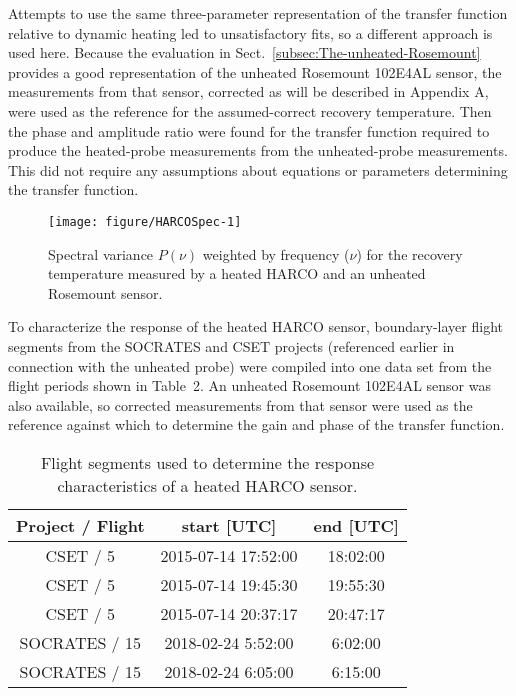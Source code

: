 \documentclass[11pt,twoside,american,12pt,twoside,american]{article}\usepackage[]{graphicx}\usepackage[]{color}
\makeatletter
\def\maxwidth{ %
  \ifdim\Gin@nat@width>\linewidth
    \linewidth
  \else
    \Gin@nat@width
  \fi
}
\newenvironment{knitrout}{}{} %
\providecommand{\tabularnewline}{\\}
\makeatother
\begin{document}
Attempts to use the same three-parameter representation of the transfer
function relative to dynamic heating led to unsatisfactory fits, so
a different approach is used here. Because the evaluation in Sect.~\ref{subsec:The-unheated-Rosemount}
provides a good representation of the unheated Rosemount 102E4AL sensor,
the measurements from that sensor, corrected as will be described
in Appendix A, were used as the reference for the assumed-correct
recovery temperature. Then the phase and amplitude ratio were found
for the transfer function required to produce the heated-probe measurements
from the unheated-probe measurements. This did not require any assumptions
about equations or parameters determining the transfer function.







\begin{knitrout}
\color{fgcolor}\begin{figure}[t]

{\centering \texttt{[image: figure/HARCOSpec-1]} 

}

\caption[Spectral variance $P(\nu)$ weighted by frequency ($\nu$) for the recovery temperature measured by a heated  HARCO and an unheated Rosemount sensor]{Spectral variance $P(\nu)$ weighted by frequency ($\nu$) for the recovery temperature measured by a heated  HARCO and an unheated Rosemount sensor.}\label{fig:HARCOSpec}
\end{figure}


\end{knitrout}



To characterize the response of the heated HARCO sensor, boundary-layer
flight segments from the SOCRATES and CSET projects (referenced earlier
in connection with the unheated probe) were compiled into one data
set from the flight periods shown in Table~2. An unheated Rosemount
102E4AL sensor was also available, so corrected measurements from
that sensor were used as the reference against which to determine
the gain and phase of the transfer function.
\begin{table}[h]
\begin{centering}
\begin{tabular}{|c|c|c|}
\hline 
\textbf{Project / Flight} &
\textbf{start {[}UTC{]}} &
\textbf{end {[}UTC{]}}\tabularnewline
\hline 
\hline 
CSET / 5 &
2015-07-14 17:52:00 &
18:02:00\tabularnewline
\hline 
CSET / 5 &
2015-07-14 19:45:30 &
19:55:30\tabularnewline
\hline 
CSET / 5 &
2015-07-14 20:37:17 &
20:47:17\tabularnewline
\hline 
SOCRATES / 15 &
2018-02-24 5:52:00 &
6:02:00\tabularnewline
\hline 
SOCRATES / 15 &
2018-02-24 6:05:00 &
6:15:00\tabularnewline
\hline 
\end{tabular}
\par\end{centering}
\caption{Flight segments used to determine the response characteristics of
a heated HARCO sensor.}
\end{table}
\end{document}
